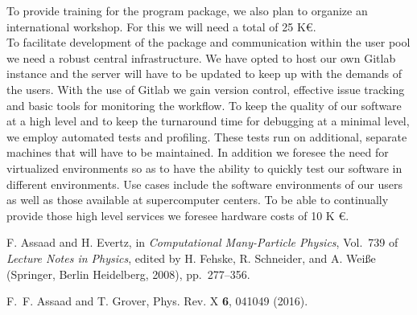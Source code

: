 \documentclass[12pt]{article}
\begin{document}
To provide training for the program package, we also plan to organize an international  workshop. For this we  will need a total of 25 K\euro.  \\

To facilitate development of the package and communication within the user pool we need a  
robust central infrastructure. We have opted to host our own Gitlab instance and the server will have to be updated to keep up with the demands of the users. 
With the use of Gitlab we gain version control, effective issue tracking and basic tools for monitoring the workflow. To 
keep the quality of our software at a high level and to keep the turnaround time for debugging at a minimal level,
 we employ automated tests and profiling. These tests run on additional, separate machines that will have to be maintained.
 In addition we foresee the need for virtualized environments so as to have  the ability to quickly test our software in 
different environments. Use cases include the software environments of our users as well as those available at  
supercomputer centers. To be able to continually provide those high level services  we foresee hardware costs of 10 K \euro.




% 
% 
%
\small 
\begin{thebibliography}{1}

F. Assaad and H. Evertz,  in {\em Computational Many-Particle Physics},
  Vol.~739 of {\em Lecture Notes in Physics}, edited by H. Fehske, R.
  Schneider, and A. Wei{\ss}e (Springer, Berlin Heidelberg, 2008), pp.\
  277--356.

F.~F. Assaad and T. Grover, Phys. Rev. X {\bf 6},  041049  (2016).

\end{thebibliography}
\normalsize
\end{document}
